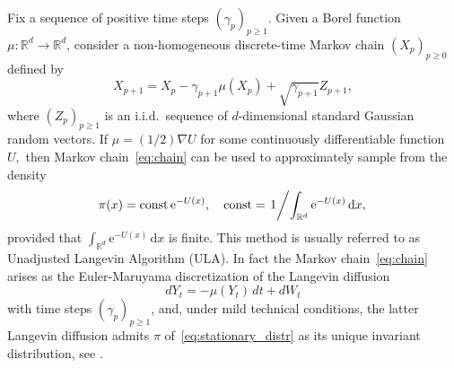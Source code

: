 \documentclass[article]{elsarticle}
\def\rmd{\mathrm{d}}
\def\rme{\mathrm{e}}
\begin{document}
\begin{example}
\label{exam:langevin-algorithm}
Fix a sequence of positive time steps \((\gamma_p)_{p\geq 1}.\) Given a Borel function $\mu\colon\mathbb{R}^{d}\to\mathbb{R}^{d}$,
consider a non-homogeneous
discrete-time Markov chain $(X_{p})_{p\geq0}$ defined by
\begin{equation}\label{eq:chain}
X_{p+1}=X_{p}-\gamma_{p+1}\mu(X_{p})+\sqrt{\gamma_{p+1}}Z_{p+1},\end{equation}
where $\left(Z_{p}\right)_{p\geq1}$ is an i.i.d.\ sequence of $d$-dimensional
standard Gaussian random vectors. If
${\mu=(1/2)\nabla U}$
for some continuously differentiable function $U,$ then Markov chain~\eqref{eq:chain} can be used to approximately sample from the density
\begin{equation}\label{eq:stationary_distr}
\pi(x)= \mathrm{const}\,\rme^{-U(x)}, \quad \mathrm{const}= \left. 1 \middle /{\int_{\mathbb{R}^{d}} \rme^{-U(x)}\, \rmd x,} \right.
\end{equation}
provided that \(\int_{\mathbb{R}^{d}} \rme^{-U(x)}\,\rmd x\) is finite. This method is usually referred to as
Unadjusted Langevin Algorithm (ULA).
In fact the Markov chain~\eqref{eq:chain}
arises as the Euler-Maruyama discretization
of the Langevin diffusion
$$
dY_t=-\mu(Y_t)\,dt+dW_t
$$
with time steps $(\gamma_p)_{p\ge1}$,
and,  under mild technical conditions, the latter Langevin diffusion admits $\pi$
of~\eqref{eq:stationary_distr}
as its unique invariant distribution, see \cite{dalalyan2017theoretical}.
\end{example}
\end{document}

